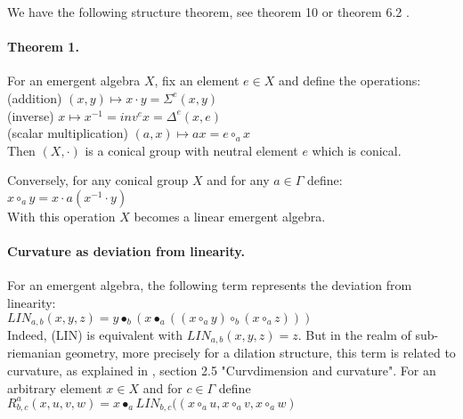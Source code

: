\documentclass{article}
\begin{document}
We have the following structure theorem, see theorem 10 \cite{buligadil1} or theorem 6.2 \cite{buligaem}. \\

\paragraph{Theorem 1.} For an emergent algebra $X$, fix an element $e \in X$ and define the operations: \\

(addition) $\displaystyle (x,y) \mapsto  x \cdot y = \Sigma^{e} (x , y)$  \\

(inverse) $\displaystyle x \mapsto x^{-1} = inv^{e} x = \Delta^{e} (x,e)$ \\

(scalar multiplication) $(a,x) \mapsto  a x = e \circ_{a} x$ \\

Then $\displaystyle (X,\cdot)$ is a conical group with neutral element $e$ which is conical. 

Conversely, for any conical group $X$ and for any $a \in \Gamma$ define: \\ 

$\displaystyle x \circ_{a} y =  x \cdot a ( x^{-1} \cdot y)$ \\ 

With this operation $X$ becomes a linear emergent algebra. \\ 

\paragraph{Curvature as deviation from linearity.} For an emergent algebra, the following term represents the deviation from linearity: \\

$\displaystyle LIN_{a,b}(x,y,z) =   y \bullet_{b} (x \bullet_{a} ((x \circ_{a} y) \circ_{b} (x \circ_{a} z)))$ \\

Indeed, (LIN) is equivalent with  $\displaystyle LIN_{a,b}(x,y,z) = z$. But in the realm of sub-riemanian geometry, more precisely for a dilation structure, this term is related to curvature, as explained in \cite{buligasub}, section 2.5 "Curvdimension and curvature". For an arbitrary element $x \in X$ and for $c \in \Gamma$ define \\

$\displaystyle R^{a}_{b,c}(x,u,v,w) = x \bullet_{a} LIN_{b,c} ((x \circ_{a} u, x \circ_{a} v, x \circ_{a} w) $\\
\end{document}
